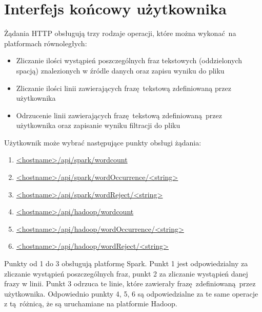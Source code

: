 \section{Interfejs końcowy użytkownika}\label{sec:user_interfaces}
Żądania HTTP obsługują trzy rodzaje operacji, które można wykonać na platformach równoległych:
\begin{itemize}
	\item {Zliczanie ilości wystąpień poszczególnych fraz tekstowych (oddzielonych spacją) znalezionych w źródle danych oraz zapisu wyniku do pliku}
	\item {Zliczanie ilości linii zawierających frazę tekstową zdefiniowaną przez użytkownika}
	\item {Odrzucenie linii zawierających frazę tekstową zdefiniowaną przez użytkownika oraz zapisanie wyniku filtracji do pliku}
\end{itemize}
Użytkownik może wybrać następujące punkty obsługi żądania:
\begin{enumerate}
	\item{\url{<hostname>/api/spark/wordcount}}
	\item{\url{<hostname>/api/spark/wordOccurrence/<string> }}
	\item{\url{<hostname>/api/spark/wordReject/<string> }}
	\item{\url{<hostname>/api/hadoop/wordcount}}
	\item{\url{<hostname>/api/hadoop/wordOccurrence/<string>}}
	\item{\url{<hostname>/api/hadoop/wordReject/<string> }}
\end{enumerate}
Punkty od 1 do 3 obsługują platformę Spark. Punkt 1 jest odpowiedzialny za zliczanie wystąpień poszczególnych fraz, punkt 2 za zliczanie wystąpień danej frazy w linii. Punkt 3 odrzuca te linie, które zawierały frazę zdefiniowaną przez użytkownika. Odpowiednio punkty 4, 5, 6 są odpowiedzialne za te same operacje z tą różnicą, że są uruchamiane na platformie Hadoop.  

